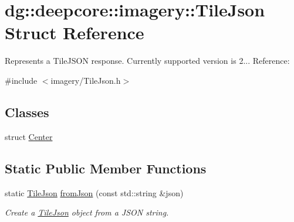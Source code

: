 \hypertarget{structdg_1_1deepcore_1_1imagery_1_1_tile_json}{}\section{dg\+:\+:deepcore\+:\+:imagery\+:\+:Tile\+Json Struct Reference}
\label{structdg_1_1deepcore_1_1imagery_1_1_tile_json}


Represents a Tile\+J\+S\+ON response. Currently supported version is 2... Reference\+: \href{https://github.com/mapbox/tilejson-spec/tree/master/2.0.0}{\tt }  




{\ttfamily \#include $<$imagery/\+Tile\+Json.\+h$>$}

\subsection*{Classes}
\begin{DoxyCompactItemize}
\item 
struct \hyperlink{structdg_1_1deepcore_1_1imagery_1_1_tile_json_1_1_center}{Center}
\end{DoxyCompactItemize}
\subsection*{Static Public Member Functions}
\begin{DoxyCompactItemize}
\item 
static \hyperlink{structdg_1_1deepcore_1_1imagery_1_1_tile_json}{Tile\+Json} \hyperlink{group___imagery_module_ga00a8cf6ff58f7d1e46ab5d710efe8e79}{from\+Json} (const std\+::string \&json)
\begin{DoxyCompactList}\small\item\em Create a \hyperlink{structdg_1_1deepcore_1_1imagery_1_1_tile_json}{Tile\+Json} object from a J\+S\+ON string. \end{DoxyCompactList}\end{DoxyCompactItemize}
